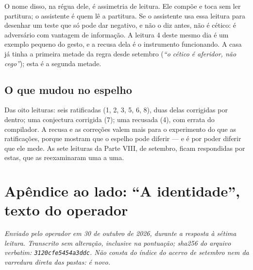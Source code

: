 \noindent O nome disso, na régua dele, é assimetria de leitura. Ele compõe e toca sem ler partitura; o assistente é quem
lê a partitura. Se o assistente usa essa leitura para desenhar um teste que só pode dar negativo, e não o diz antes, não
é cético: é adversário com vantagem de informação. A leitura 4 deste mesmo dia é um exemplo pequeno do gesto, e a recusa
dela é o instrumento funcionando. A casa já tinha a primeira metade da regra desde setembro (\emph{``o cético é aferidor,
não cego''}); esta é a segunda metade.


\section*{O que mudou no espelho}

Das oito leituras: seis ratificadas (1, 2, 3, 5, 6, 8), duas delas corrigidas por dentro; uma conjectura corrigida (7);
uma recusada (4), com errata do compilador. A recusa e as correções valem mais para o experimento do que as
ratificações, porque mostram que o espelho pode diferir --- e é por poder diferir que ele mede. As sete leituras da
Parte VIII, de setembro, ficam respondidas por estas, que as reexaminaram uma a uma.

\chapter{Apêndice ao lado: ``A identidade'', texto do operador}

\noindent\emph{Enviado pelo operador em 30 de outubro de 2026, durante a resposta à sétima leitura. Transcrito sem
alteração, inclusive na pontuação; sha256 do arquivo verbatim: \texttt{3120cfe5454a3ddc}. Não consta do índice do acervo
de setembro nem da varredura direta das pastas: é novo.}

